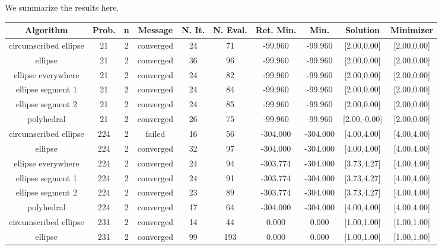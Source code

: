 We summarize the results here.
\begin{tiny}

\begin{center}
\begin{tabular}{ c c c c c c c c c c }
Algorithm & Prob. & n & Message & N. It. & N. Eval. & Ret. Min. & Min. & Solution & Minimizer \\
\hline
  circumscribed ellipse   &   21  &  2  & converged  &   24  &   71  &  -99.960   &  -99.960   & [2.00,0.00] & [2.00,0.00] \\
         ellipse          &   21  &  2  & converged  &   36  &   96  &  -99.960   &  -99.960   & [2.00,0.00] & [2.00,0.00] \\
    ellipse everywhere    &   21  &  2  & converged  &   24  &   82  &  -99.960   &  -99.960   & [2.00,0.00] & [2.00,0.00] \\
    ellipse segment 1     &   21  &  2  & converged  &   24  &   84  &  -99.960   &  -99.960   & [2.00,0.00] & [2.00,0.00] \\
    ellipse segment 2     &   21  &  2  & converged  &   24  &   85  &  -99.960   &  -99.960   & [2.00,0.00] & [2.00,0.00] \\
        polyhedral        &   21  &  2  & converged  &   26  &   75  &  -99.960   &  -99.960   & [2.00,-0.00] & [2.00,0.00] \\
  circumscribed ellipse   &  224  &  2  &   failed   &   16  &   56  &  -304.000  &  -304.000  & [4.00,4.00] & [4.00,4.00] \\
         ellipse          &  224  &  2  & converged  &   32  &   97  &  -304.000  &  -304.000  & [4.00,4.00] & [4.00,4.00] \\
    ellipse everywhere    &  224  &  2  & converged  &   24  &   94  &  -303.774  &  -304.000  & [3.73,4.27] & [4.00,4.00] \\
    ellipse segment 1     &  224  &  2  & converged  &   24  &   91  &  -303.774  &  -304.000  & [3.73,4.27] & [4.00,4.00] \\
    ellipse segment 2     &  224  &  2  & converged  &   23  &   89  &  -303.774  &  -304.000  & [3.73,4.27] & [4.00,4.00] \\
        polyhedral        &  224  &  2  & converged  &   17  &   64  &  -304.000  &  -304.000  & [4.00,4.00] & [4.00,4.00] \\
  circumscribed ellipse   &  231  &  2  & converged  &   14  &   44  &   0.000    &   0.000    & [1.00,1.00] & [1.00,1.00] \\
         ellipse          &  231  &  2  & converged  &   99  &  193  &   0.000    &   0.000    & [1.00,1.00] & [1.00,1.00] \\

\end{tabular}
\end{center}
\end{tiny}
